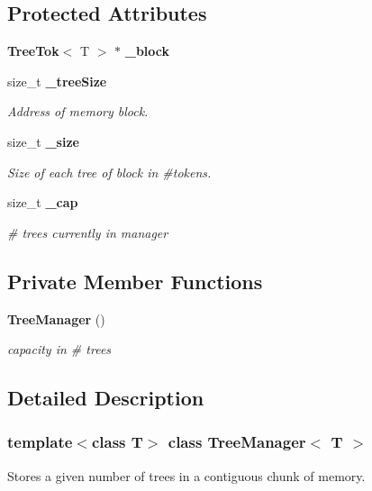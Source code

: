 \subsection*{Protected Attributes}
\begin{CompactItemize}
\item 
{\bf Tree\-Tok}$<$ T $>$ $\ast$ {\bf \_\-block}
\item 
size\_\-t {\bf \_\-tree\-Size}
\begin{CompactList}\small\item\em Address of memory block. \item\end{CompactList}\item 
size\_\-t {\bf \_\-size}
\begin{CompactList}\small\item\em Size of each tree of block in \#tokens. \item\end{CompactList}\item 
size\_\-t {\bf \_\-cap}
\begin{CompactList}\small\item\em \# trees currently in manager \item\end{CompactList}\end{CompactItemize}
\subsection*{Private Member Functions}
\begin{CompactItemize}
\item 
{\bf Tree\-Manager} ()
\begin{CompactList}\small\item\em capacity in \# trees \item\end{CompactList}\end{CompactItemize}


\subsection{Detailed Description}
\subsubsection*{template$<$class T$>$ class Tree\-Manager$<$ T $>$}

Stores a given number of trees in a contiguous chunk of memory. 

